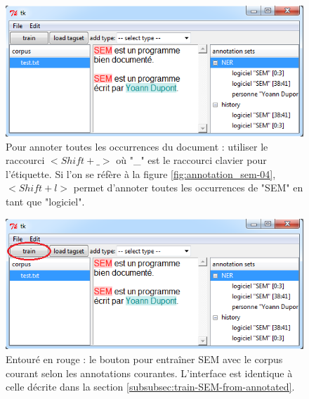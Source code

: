 \documentclass[manual-fr.tex]{subfiles}
\begin{document}
\begin{figure}[ht!]
    \begin{center}
    \includegraphics[scale=0.5]{fr/images/annotation_sem-05.png}
    \end{center}
    \caption{Pour annoter toutes les occurrences du document : utiliser le raccourci $<Shift+\_>$ où "\_" est le raccourci clavier pour l'étiquette. Si l'on se réfère à la figure \ref{fig:annotation_sem-04}, $<Shift+l>$ permet d'annoter toutes les occurrences de "SEM" en tant que "logiciel".}
    \label{fig:annotation_sem-05}
\end{figure}



\begin{figure}[ht!]
    \begin{center}
    \includegraphics[scale=0.5]{fr/images/annotation_sem-06.png}
    \end{center}
    \caption{Entouré en rouge : le bouton pour entraîner SEM avec le corpus courant selon les annotations courantes. L'interface est identique à celle décrite dans la section \ref{subsubsec:train-SEM-from-annotated}.}
    \label{fig:annotation_sem-06}
\end{figure}
\end{document}
